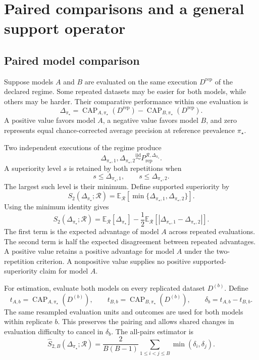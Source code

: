 \documentclass[11pt]{article}
\newcommand{\CAP}{\operatorname{CAP}}
\newcommand{\Regime}{\mathcal{R}}
\newcommand{\E}{\mathbb{E}}
\newcommand{\iid}{\mathrel{\overset{\mathrm{iid}}{\sim}}}
\theoremstyle{remark}
\begin{document}
\section{Paired comparisons and a general support operator}
\label{sec:paired}

\subsection{Paired model comparison}

Suppose models $A$ and $B$ are evaluated on the same execution $D^{\mathrm{rep}}$ of the declared regime. Some repeated datasets may be easier for both models, while others may be harder. Their comparative performance within one evaluation is
\begin{equation}
\Delta_{\pi_\star}
=
\CAP_{A,\pi_\star}(D^{\mathrm{rep}})
-
\CAP_{B,\pi_\star}(D^{\mathrm{rep}}).
\label{eq:paired-difference}
\end{equation}
A positive value favors model $A$, a negative value favors model $B$, and zero represents equal chance-corrected average precision at reference prevalence $\pi_\star$.

Two independent executions of the regime produce
\[
\Delta_{\pi_\star,1},
\Delta_{\pi_\star,2}
\iid
P_{\mathrm{rep}}^{\Regime,\Delta_{\pi_\star}}.
\]
A superiority level $s$ is retained by both repetitions when
\[
s\leq \Delta_{\pi_\star,1},
\qquad
s\leq \Delta_{\pi_\star,2}.
\]
The largest such level is their minimum. Define supported superiority by
\begin{equation}
S_2(\Delta_{\pi_\star};\Regime)
=
\E_{\Regime}
\left[
\min\{
\Delta_{\pi_\star,1},
\Delta_{\pi_\star,2}
\}
\right].
\label{eq:paired}
\end{equation}
Using the minimum identity gives
\begin{equation}
S_2(\Delta_{\pi_\star};\Regime)
=
\E_{\Regime}[\Delta_{\pi_\star}]
-
\frac12
\E_{\Regime}
\left[
|\Delta_{\pi_\star,1}-\Delta_{\pi_\star,2}|
\right].
\label{eq:paired-decomposition}
\end{equation}
The first term is the expected advantage of model $A$ across repeated evaluations. The second term is half the expected disagreement between repeated advantages. A positive value retains a positive advantage for model $A$ under the two-repetition criterion. A nonpositive value supplies no positive supported-superiority claim for model $A$.

For estimation, evaluate both models on every replicated dataset $D^{(b)}$. Define
\[
t_{A,b}=\CAP_{A,\pi_\star}(D^{(b)}),
\qquad
t_{B,b}=\CAP_{B,\pi_\star}(D^{(b)}),
\qquad
\delta_b=t_{A,b}-t_{B,b}.
\]
The same resampled evaluation units and outcomes are used for both models within replicate $b$. This preserves the pairing and allows shared changes in evaluation difficulty to cancel in $\delta_b$. The all-pairs estimator is
\begin{equation}
\widehat S_{2,B}(\Delta_{\pi_\star};\Regime)
=
\frac{2}{B(B-1)}
\sum_{1\leq i<j\leq B}
\min(\delta_i,\delta_j).
\label{eq:paired-estimator}
\end{equation}
\end{document}
